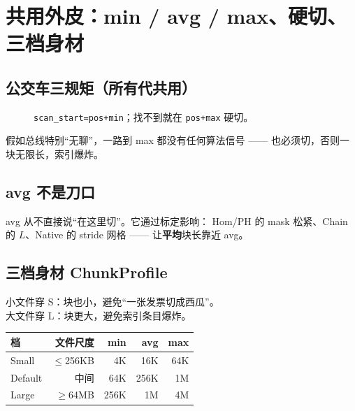 \chapter{共用外皮：min / avg / max、硬切、三档身材}
\label{ch:scan-profile}

\section{公交车三规矩（所有代共用）}

\begin{figure}[htbp]
\centering
{}
\caption{\texttt{scan\_start=pos+min}；找不到就在 \texttt{pos+max} 硬切。}
\label{fig:bus-rules}
\end{figure}

\begin{toybox}[硬切]
假如总线特别``无聊''，一路到 max 都没有任何算法信号 —— 也必须切，否则一块无限长，索引爆炸。
\end{toybox}

\section{avg 不是刀口}

avg 从不直接说``在这里切''。它通过标定影响：
Hom/PH 的 mask 松紧、Chain 的 $L$、Native 的 stride 网格 —— 让\textbf{平均}块长靠近 avg。

\section{三档身材 ChunkProfile}

\begin{metaphor}[S / M / L 校服]
小文件穿 S：块也小，避免``一张发票切成西瓜''。\\
大文件穿 L：块更大，避免索引条目爆炸。
\end{metaphor}

\begin{center}
\begin{tabular}{@{}lrrrr@{}}
\toprule
档 & 文件尺度 & min & avg & max \\
\midrule
Small & $\le$256KB & 4K & 16K & 64K \\
Default & 中间 & 64K & 256K & 1M \\
Large & $\ge$64MB & 256K & 1M & 4M \\
\bottomrule
\end{tabular}
\end{center}

